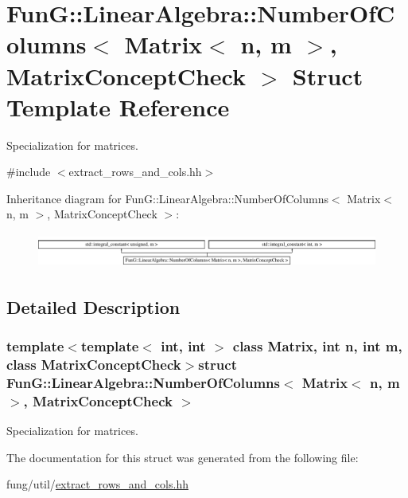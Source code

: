 \hypertarget{structFunG_1_1LinearAlgebra_1_1NumberOfColumns_3_01Matrix_3_01n_00_01m_01_4_00_01MatrixConceptCheck_01_4}{}\section{Fun\+G\+:\+:Linear\+Algebra\+:\+:Number\+Of\+Columns$<$ Matrix$<$ n, m $>$, Matrix\+Concept\+Check $>$ Struct Template Reference}
\label{structFunG_1_1LinearAlgebra_1_1NumberOfColumns_3_01Matrix_3_01n_00_01m_01_4_00_01MatrixConceptCheck_01_4}


Specialization for matrices.  




{\ttfamily \#include $<$extract\+\_\+rows\+\_\+and\+\_\+cols.\+hh$>$}

Inheritance diagram for Fun\+G\+:\+:Linear\+Algebra\+:\+:Number\+Of\+Columns$<$ Matrix$<$ n, m $>$, Matrix\+Concept\+Check $>$\+:\begin{figure}[H]
\begin{center}
\leavevmode
\includegraphics[height=1.154639cm]{structFunG_1_1LinearAlgebra_1_1NumberOfColumns_3_01Matrix_3_01n_00_01m_01_4_00_01MatrixConceptCheck_01_4}
\end{center}
\end{figure}


\subsection{Detailed Description}
\subsubsection*{template$<$template$<$ int, int $>$ class Matrix, int n, int m, class Matrix\+Concept\+Check$>$struct Fun\+G\+::\+Linear\+Algebra\+::\+Number\+Of\+Columns$<$ Matrix$<$ n, m $>$, Matrix\+Concept\+Check $>$}

Specialization for matrices. 

The documentation for this struct was generated from the following file\+:\begin{DoxyCompactItemize}
\item 
fung/util/\hyperlink{extract__rows__and__cols_8hh}{extract\+\_\+rows\+\_\+and\+\_\+cols.\+hh}\end{DoxyCompactItemize}
